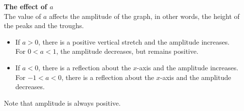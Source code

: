 \textbf{The effect of $a$}
\\
The value of $a$ affects the amplitude of the graph, in other words, the height of the peaks and the troughs.
\begin{itemize}
 \item If $a>0$, there is a positive vertical stretch and the amplitude increases.\\
For $0<a<1$, the amplitude decreases, but remains positive.
\item If $a<0$, there is a reflection about the $x$-axis and the amplitude increases.\\ 
For $-1<a<0$, there is a reflection about the $x$-axis and the amplitude decreases.
\end{itemize}

Note that amplitude is always positive.




